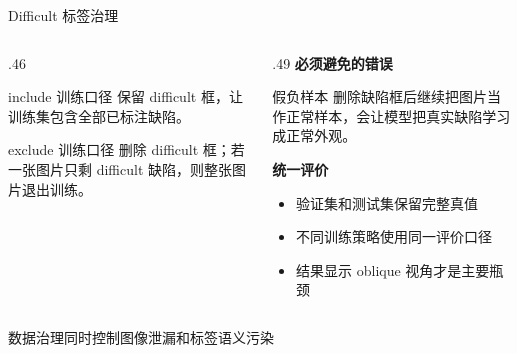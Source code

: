 \documentclass[aspectratio=169,10pt]{beamer}
\begin{document}
\begin{frame}{Difficult 标签治理}
  \begin{columns}[T,onlytextwidth]
    \begin{column}{.46\textwidth}
      \begin{block}{include 训练口径}
        保留 difficult 框，让训练集包含全部已标注缺陷。
      \end{block}

      \vspace{.55em}
      \begin{block}{exclude 训练口径}
        删除 difficult 框；若一张图片只剩 difficult 缺陷，则整张图片退出训练。
      \end{block}
    \end{column}
    \begin{column}{.49\textwidth}
      \textbf{必须避免的错误}

      \vspace{.5em}
      \begin{alertblock}{假负样本}
        删除缺陷框后继续把图片当作正常样本，会让模型把真实缺陷学习成正常外观。
      \end{alertblock}

      \vspace{.55em}
      \textbf{统一评价}
      \begin{itemize}
        \item 验证集和测试集保留完整真值
        \item 不同训练策略使用同一评价口径
        \item 结果显示 oblique 视角才是主要瓶颈
      \end{itemize}
    \end{column}
  \end{columns}

  \vfill
  \centering
  \textcolor{seugreen}{\large 数据治理同时控制图像泄漏和标签语义污染}
\end{frame}

\end{document}
